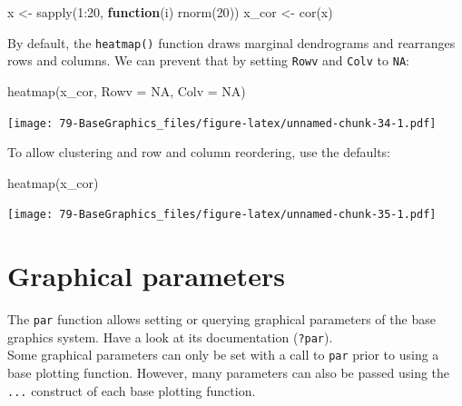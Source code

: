 \documentclass[
]{book}
\newenvironment{Shaded}{\begin{snugshade}}{\end{snugshade}}
\newcommand{\AttributeTok}[1]{\textcolor[rgb]{0.77,0.63,0.00}{#1}}
\newcommand{\ConstantTok}[1]{\textcolor[rgb]{0.00,0.00,0.00}{#1}}
\newcommand{\ControlFlowTok}[1]{\textcolor[rgb]{0.13,0.29,0.53}{\textbf{#1}}}
\newcommand{\DecValTok}[1]{\textcolor[rgb]{0.00,0.00,0.81}{#1}}
\newcommand{\FunctionTok}[1]{\textcolor[rgb]{0.00,0.00,0.00}{#1}}
\newcommand{\NormalTok}[1]{#1}
\newcommand{\OtherTok}[1]{\textcolor[rgb]{0.56,0.35,0.01}{#1}}
\newcommand{\SpecialCharTok}[1]{\textcolor[rgb]{0.00,0.00,0.00}{#1}}
\begin{document}
\begin{Shaded}
\begin{Highlighting}[]
\NormalTok{x }\OtherTok{\textless{}{-}} \FunctionTok{sapply}\NormalTok{(}\DecValTok{1}\SpecialCharTok{:}\DecValTok{20}\NormalTok{, }\ControlFlowTok{function}\NormalTok{(i) }\FunctionTok{rnorm}\NormalTok{(}\DecValTok{20}\NormalTok{))}
\NormalTok{x\_cor }\OtherTok{\textless{}{-}} \FunctionTok{cor}\NormalTok{(x)}
\end{Highlighting}
\end{Shaded}

By default, the \texttt{heatmap()} function draws marginal dendrograms and rearranges rows and columns. We can prevent that by setting \texttt{Rowv} and \texttt{Colv} to \texttt{NA}:

\begin{Shaded}
\begin{Highlighting}[]
\FunctionTok{heatmap}\NormalTok{(x\_cor, }\AttributeTok{Rowv =} \ConstantTok{NA}\NormalTok{, }\AttributeTok{Colv =} \ConstantTok{NA}\NormalTok{)}
\end{Highlighting}
\end{Shaded}

\texttt{[image: 79-BaseGraphics\_files/figure-latex/unnamed-chunk-34-1.pdf]}

To allow clustering and row and column reordering, use the defaults:

\begin{Shaded}
\begin{Highlighting}[]
\FunctionTok{heatmap}\NormalTok{(x\_cor)}
\end{Highlighting}
\end{Shaded}

\texttt{[image: 79-BaseGraphics\_files/figure-latex/unnamed-chunk-35-1.pdf]}

\hypertarget{graphical-parameters}{%
\section{Graphical parameters}\label{graphical-parameters}}

The \texttt{par} function allows setting or querying graphical parameters of the base graphics system. Have a look at its documentation (\texttt{?par}).\\
Some graphical parameters can only be set with a call to \texttt{par} prior to using a base plotting function. However, many parameters can also be passed using the \texttt{...} construct of each base plotting function.
\end{document}
